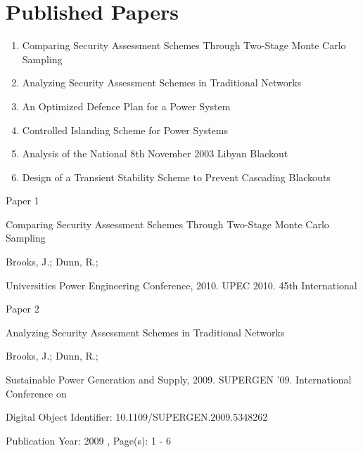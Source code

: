 \documentclass[a4paper,oneside,12pt]{report}
\begin{document}
\chapter{Published Papers}

\begin{large}
\begin{enumerate}
\item Comparing Security Assessment Schemes Through Two-Stage Monte Carlo Sampling
\item Analyzing Security Assessment Schemes in Traditional Networks
\item An Optimized Defence Plan for a Power System
\item Controlled Islanding Scheme for Power Systems
\item Analysis of the National 8th November 2003 Libyan Blackout
\item Design of a Transient Stability Scheme to Prevent Cascading Blackouts
\end{enumerate}
\end{large}

\pagebreak


\begin{center}\begin{large}
{\Huge Paper 1}
\vspace{40px}

Comparing Security Assessment Schemes Through Two-Stage Monte Carlo Sampling
\vspace{40px}

Brooks, J.; Dunn, R.;
\vspace{40px}

Universities Power Engineering Conference, 2010. UPEC 2010. 45th International
\end{large}\end{center}




\begin{center}\begin{large}
{\Huge Paper 2}
\vspace{40px}

Analyzing Security Assessment Schemes in Traditional Networks
\vspace{40px}

Brooks, J.; Dunn, R.;
\vspace{40px}

Sustainable Power Generation and Supply, 2009. SUPERGEN '09. International Conference on
\vspace{60px}

Digital Object Identifier: 10.1109/SUPERGEN.2009.5348262

Publication Year: 2009 , Page(s): 1 - 6
\end{large}\end{center}
\end{document}
